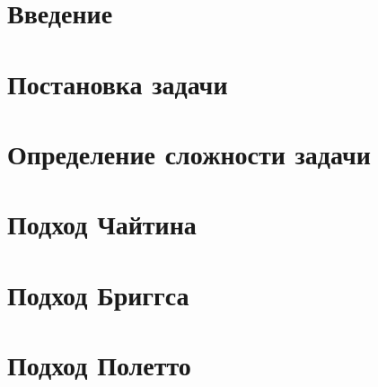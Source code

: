 



\section{Введение}



\section{Постановка задачи}



\section{Определение сложности задачи} %

\label{seg:complexity}



\section{Подход Чайтина}



\section{Подход Бриггса}



\section{Подход Полетто}



{}




